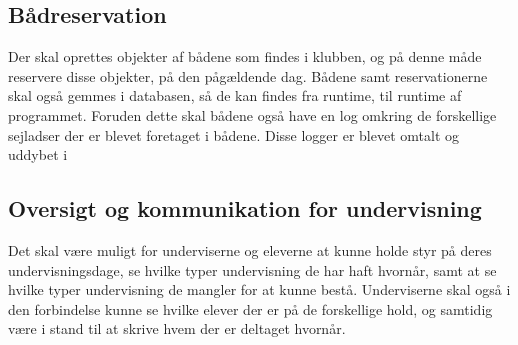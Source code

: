 \subsection{Bådreservation}

Der skal oprettes objekter af bådene som findes i klubben, og på denne måde reservere disse objekter, på den pågældende
dag. Bådene samt reservationerne skal også gemmes i databasen, så de kan findes fra runtime, til runtime af programmet.
Foruden dette skal bådene også have en log omkring de forskellige sejladser der er blevet foretaget i bådene. Disse logger er blevet omtalt og uddybet i 

\subsection{Oversigt og kommunikation for undervisning}

Det skal være muligt for underviserne og eleverne at kunne holde styr på deres undervisningsdage, se hvilke typer
undervisning de har haft hvornår, samt at se hvilke typer undervisning de mangler for at kunne bestå. Underviserne skal også i den forbindelse kunne se hvilke elever der er på de forskellige hold, og samtidig være i stand til at skrive hvem der er deltaget hvornår.
